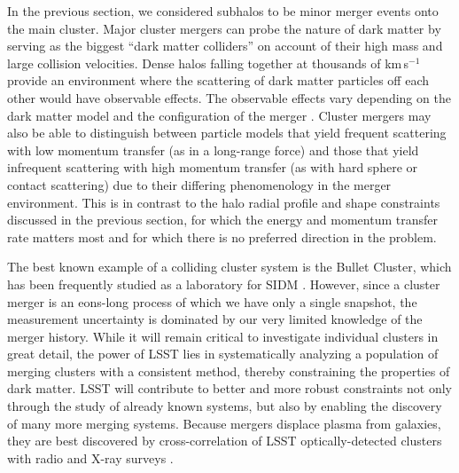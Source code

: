 In the previous section, we considered subhalos to be minor merger events onto the main cluster.  Major cluster mergers can probe the nature of dark matter by serving as the biggest ``dark matter colliders'' on account of their high mass and large collision velocities. Dense halos falling together at thousands of km\,s$^{-1}$ provide an environment where the scattering of dark matter particles off each other would have observable effects.  The observable effects vary depending on the dark matter model and the configuration of the merger \citep{Kim:2016ujt}.  %
Cluster mergers may also be able to distinguish between particle models that yield frequent scattering with low momentum transfer (as in a long-range force) and those that yield infrequent scattering with high momentum transfer (as with hard sphere or contact scattering) due to their differing phenomenology in the merger environment.  This is in contrast to the halo radial profile and shape constraints discussed in the previous section, for which the energy and momentum transfer rate matters most and for which there is no preferred direction in the problem.

The best known example of a colliding cluster system is the Bullet Cluster, which has been frequently studied as a laboratory for SIDM \citep{Randall:2007ph,2017MNRAS.465..569R}. 
However, since a cluster merger is an eons-long process of which we have only a single snapshot, the measurement uncertainty is dominated by our very limited knowledge of the merger history. While it will remain critical to investigate individual clusters in great detail, the power of LSST lies in systematically analyzing a population of merging clusters with a consistent method, thereby constraining the properties of dark matter.
LSST will contribute to better and more robust constraints not only through the study of already known systems, but also by enabling the discovery of many more merging systems. Because mergers displace plasma from galaxies, they are best discovered by cross-correlation of LSST optically-detected clusters with radio and X-ray surveys \citep{Golovich:2018,Wilber2018}.

